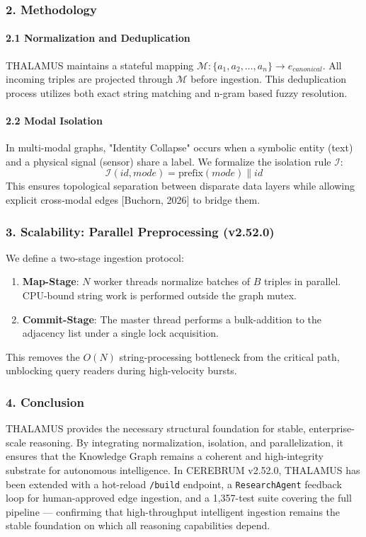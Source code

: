 \subsubsection{2. Methodology}

\paragraph{2.1 Normal\-ization and Dedupl\-ication}
THALAMUS maintains a stateful mapping $\mathcal{M}: \{a_1, a_2, \dots, a_n\} \to e_{canonical}$. All incoming triples are projected through $\mathcal{M}$ before ingestion. This dedup\-lication process \cite{doan2012principles} utilizes both exact string matching and n-gram based fuzzy resolution.

\paragraph{2.2 Modal Isolation}
In multi-modal graphs, "Identity Collapse" occurs when a symbolic entity (text) and a physical signal (sensor) share a label. We formalize the isolation rule $\mathcal{I}$:
\begin{equation}
\mathcal{I}(id, mode) = \text{prefix}(mode) \mathbin{\|} id
\end{equation}
This ensures topological separation between disparate data layers while allowing explicit cross-modal edges [Buchorn, 2026] to bridge them.

\subsubsection{3. Scalability: Parallel Prepro\-cessing (v2.52.0)}
We define a two-stage ingestion protocol:
\begin{enumerate}
\item \textbf{Map-Stage}: $N$ worker threads normalize batches of $B$ triples in parallel. CPU-bound string work is performed outside the graph mutex.
\item \textbf{Commit-Stage}: The master thread performs a bulk-addition to the adjacency list under a single lock acquisition.
\end{enumerate}
This removes the $O(N)$ string-processing bottleneck from the critical path, unblocking query readers during high-velocity bursts.

\subsubsection{4. Conclusion}
THALAMUS provides the necessary structural foundation for stable, enterprise-scale reasoning. By integrating norma\-lization, isolation, and paral\-lelization, it ensures that the Knowledge Graph remains a coherent and high-integrity substrate for autonomous intel\-ligence. In CEREBRUM v2.52.0, THALAMUS has been extended with a hot-reload \texttt{/build} endpoint, a \texttt{ResearchAgent} feedback loop for human-approved edge ingestion, and a 1,357-test suite covering the full pipeline — confirming that high-throughput intelligent ingestion remains the stable foundation on which all reasoning capab\-ilities depend.

